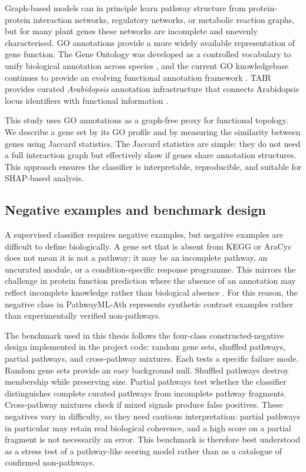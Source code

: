 \documentclass[12pt,twoside]{article}
\begin{document}
Graph-based models can in principle learn pathway structure from protein-protein interaction networks, regulatory networks, or metabolic reaction graphs, but for many plant genes these networks are incomplete and unevenly characterised. GO annotations provide a more widely available representation of gene function. The Gene Ontology was developed as a controlled vocabulary to unify biological annotation across species \citep{ashburner2000gene}, and the current GO knowledgebase continues to provide an evolving functional annotation framework \citep{geneontology2023}. TAIR provides curated \textit{Arabidopsis} annotation infrastructure that connects Arabidopsis locus identifiers with functional information \citep{berardini2015tair}.

This study uses GO annotations as a graph-free proxy for functional topology. We describe a gene set by its GO profile and by measuring the similarity between genes using Jaccard statistics. The Jaccard statistics are simple: they do not need a full interaction graph but effectively show if genes share annotation structures. This approach ensures the classifier is interpretable, reproducible, and suitable for SHAP-based analysis.

\subsection{Negative examples and benchmark design}
\label{sec:bg_negatives}

A supervised classifier requires negative examples, but negative examples are difficult to define biologically. A gene set that is absent from KEGG or AraCyc does not mean it is not a pathway; it may be an incomplete pathway, an uncurated module, or a condition-specific response programme. This mirrors the challenge in protein function prediction where the absence of an annotation may reflect incomplete knowledge rather than biological absence \citep{radivojac2013community}. For this reason, the negative class in PathwayML-Ath represents synthetic contrast examples rather than experimentally verified non-pathways.

The benchmark used in this thesis follows the four-class constructed-negative design implemented in the project code: random gene sets, shuffled pathways, partial pathways, and cross-pathway mixtures. Each tests a specific failure mode. Random gene sets provide an easy background null. Shuffled pathways destroy membership while preserving size. Partial pathways test whether the classifier distinguishes complete curated pathways from incomplete pathway fragments. Cross-pathway mixtures check if mixed signals produce false positives. 
These negatives vary in difficulty, so they need cautious interpretation: partial pathways in particular may retain real biological coherence, and a high score on a partial fragment is not necessarily an error. This benchmark is therefore best understood as a stress test of a pathway-like scoring model rather than as a catalogue of confirmed non-pathways.
\end{document}
